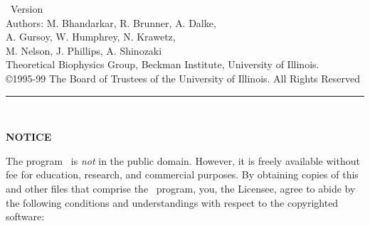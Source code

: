 
\thispagestyle{empty}

\vspace*{0.1in}

\begin{centering}
{\LARGE \NAMD\ Version \NAMDVER}\\
{\large
\bigskip
Authors: M. Bhandarkar, R. Brunner, A. Dalke,\\
A. Gursoy, W. Humphrey, N. Krawetz,\\
M. Nelson, J. Phillips, A. Shinozaki\\
\medskip
Theoretical Biophysics Group, Beckman Institute, University of Illinois.\\
\bigskip
\copyright 1995-99 The Board of Trustees of the University of Illinois.
All Rights Reserved\\
\bigskip
}
\end{centering}

  \rule{6in}{0.04in}				\\	\vspace{0.25in}

{\bf \LARGE \noindent NOTICE}
\vspace{0.25 in}

\noindent The program \NAMD\ is {\it not\/} in the public domain.
However, it is freely available without fee for
education, research, and commercial purposes.  By obtaining copies
of this and other files that comprise the \NAMD\ program, you, 
the Licensee, agree to abide by the following
conditions and understandings with respect to the copyrighted software:

